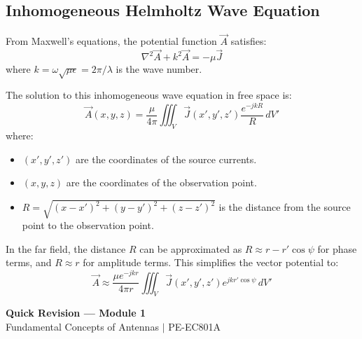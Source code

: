 \documentclass[12pt,a4paper]{article}
\begin{document}
\subsection{Inhomogeneous Helmholtz Wave Equation}
From Maxwell's equations, the potential function $\vec{A}$ satisfies:
\[
\nabla^2 \vec{A} + k^2 \vec{A} = -\mu \vec{J}
\]
where $k = \omega\sqrt{\mu\epsilon} = 2\pi/\lambda$ is the wave number. 

The solution to this inhomogeneous wave equation in free space is:
\[
\vec{A}(x, y, z) = \frac{\mu}{4\pi} \iiint_{V} \vec{J}(x', y', z') \frac{e^{-j k R}}{R} \, dV'
\]
where:
\begin{itemize}[leftmargin=*, itemsep=1pt]
  \item $(x', y', z')$ are the coordinates of the source currents.
  \item $(x, y, z)$ are the coordinates of the observation point.
  \item $R = \sqrt{(x-x')^2 + (y-y')^2 + (z-z')^2}$ is the distance from the source point to the observation point.
\end{itemize}

In the far field, the distance $R$ can be approximated as $R \approx r - r'\cos\psi$ for phase terms, and $R \approx r$ for amplitude terms. This simplifies the vector potential to:
\[
\vec{A} \approx \frac{\mu e^{-jkr}}{4\pi r} \iiint_{V} \vec{J}(x', y', z') e^{jkr'\cos\psi} \, dV'
\]

\newpage
\begin{center}
  {\large\bfseries\color{myred} Quick Revision --- Module 1}\\[3pt]
  {\small\color{mydark} Fundamental Concepts of Antennas $|$ PE-EC801A}
\end{center}
\noindent{\color{myred}\rule{\linewidth}{1.2pt}}
\vspace{4pt}
\end{document}
